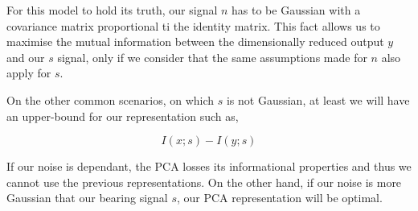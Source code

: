 For this model to hold its truth, our signal $n$ has to be Gaussian with a covariance matrix proportional ti the identity matrix. This fact allows us to maximise the mutual information between the dimensionally reduced output $y$ and our $s$ signal, only if we consider that the same assumptions made for $n$ also apply for $s$. \par

On the other common scenarios, on which $s$ is not Gaussian, at least we will have an upper-bound for our representation such as,

\begin{equation}
\label{eq:pca_upper_bound}
I(x;s) - I(y;s)
\end{equation}

If our noise is dependant, the PCA losses its informational properties and thus we cannot use the previous representations. On the other hand, if our noise is more Gaussian that our bearing signal $s$, our PCA representation will be optimal.



